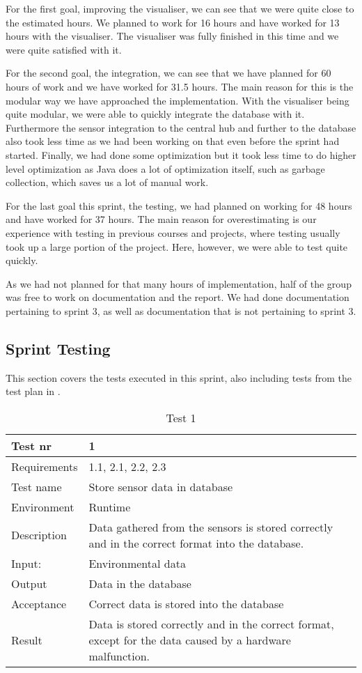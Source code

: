 \documentclass[../document]{subfiles}
\begin{document}
For the first goal, improving the visualiser, we can see that we were quite close to the estimated hours. We planned to work for 16 hours and have worked for 13 hours with the visualiser. The visualiser was fully finished in this time and we were quite satisfied with it.

For the second goal, the integration, we can see that we have planned for 60 hours of work and we have worked for 31.5 hours. The main reason for this is the modular way we have approached the implementation. With the visualiser being quite modular, we were able to quickly integrate the database with it. Furthermore the sensor integration to the central hub and further to the database also took less time as we had been working on that even before the sprint had started. Finally, we had done some optimization but it took less time to do higher level optimization as \gls{Java} does a lot of optimization itself, such as garbage collection, which saves us a lot of manual work.

For the last goal this sprint, the testing, we had planned on working for 48 hours and have worked for 37 hours. The main reason for overestimating is our experience with testing in previous courses and projects, where testing usually took up a large portion of the project. Here, however, we were able to test quite quickly.

As we had not planned for that many hours of implementation, half of the group was free to work on documentation and the report. We had done documentation pertaining to sprint 3, as well as documentation that is not pertaining to sprint 3.

\subsection{Sprint Testing}
This section covers the tests executed in this sprint, also including tests from the test plan in .

\begin{table}[H]
\caption{Test 1}
\centering
\begin{tabularx}{\textwidth}{|l|X|}
	\hline
	Test nr
	&1
	\\ \hline Requirements
	&1.1, 2.1, 2.2, 2.3
	\\ \hline Test name
	&Store sensor data in database
	\\ \hline Environment
	&Runtime
	\\ \hline Description
	&Data gathered from the sensors is stored correctly and in the correct format into the database.
	\\ \hline Input:
	&Environmental data
	\\ \hline Output
	&Data in the database
	\\ \hline Acceptance
	&Correct data is stored into the database
	\\ \hline Result
	&Data is stored correctly and in the correct format, except for the data caused by a hardware malfunction.
	\\ \hline 
\end{tabularx}
\end{table}
\end{document}
